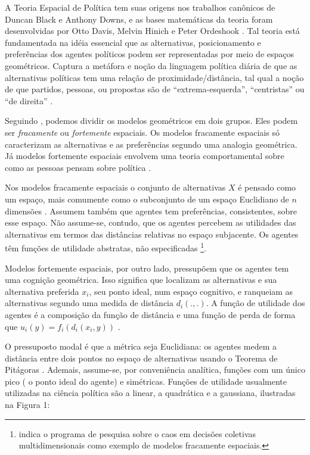 A Teoria Espacial de Política tem suas origens nos trabalhos canônicos de Duncan
Black e Anthony Downs, e as bases matemáticas da teoria foram desenvolvidas por
Otto Davis, Melvin Hinich e Peter Ordeshook \cite{black1958theory,
  downs1957economic, poole2005spatial, miller2015spatial}. Tal teoria está
fundamentada na idéia essencial que as alternativas, posicionamento e
preferências dos agentes políticos podem ser representadas por meio de espaços
geométricos. Captura a metáfora e noção da linguagem política diária de que
as alternativas políticas tem uma relação de proximidade/distância, tal qual a
noção de que partidos, pessoas, ou propostas são de ``extrema-esquerda'',
``centristas'' ou ``de direita'' \cite{munger2015choosing}.


Seguindo , podemos dividir os modelos
geométricos em dois grupos. Eles podem ser \textit{fracamente} ou
\textit{fortemente} espaciais. Os modelos fracamente espaciais só caracterizam
as alternativas e as preferências segundo uma analogia geométrica. Já modelos
fortemente espaciais envolvem uma teoria comportamental sobre como as pessoas
pensam sobre política \cite{laver2014measuring}.


Nos modelos fracamente espaciais o conjunto de alternativas \(X\) é pensado como
um espaço, mais comumente como o subconjunto de um espaço Euclidiano de \(n\)
dimensões \cite{austen1998social}. Assumem também que agentes tem preferências,
consistentes, sobre esse espaço. Não assume-se, contudo, que os agentes percebem
as utilidades das alternativas em termos das distâncias relativas no espaço
subjacente. Os agentes têm funções de utilidade abstratas, não especificadas
\cite{humphreys2010spatial}\footnote{ indica o
  programa de pesquisa sobre o caos em decisões coletivas multidimensionais
  como exemplo de modelos fracamente espaciais.}.

Modelos fortemente espaciais, por outro lado, pressupõem que os agentes tem uma
cognição geométrica. Isso significa que localizam as alternativas e sua
alternativa preferida \(x_i\), seu ponto ideal, num espaço cognitivo, e
ranqueiam as alternativas segundo uma medida de distância \(d_i(.,.)\). A função
de utilidade dos agentes é a composição da função de distância e uma função de
perda de forma que \(u_i(y) = f_i(d_i(x_i,y)) \) \cite{humphreys2010spatial,
  laver2014measuring}.

O pressuposto modal é que a métrica seja Euclidiana: os agentes medem a
distância entre dois pontos no espaço de alternativas usando o Teorema de
Pitágoras \cite{munger2015choosing}. Ademais, assume-se, por conveniência
analítica, funções com um único pico ( o ponto ideal do agente) e simétricas.
Funções de utilidade usualmente utilizadas na ciência política são a linear, a
quadrática e a gaussiana, ilustradas na Figura 1:

